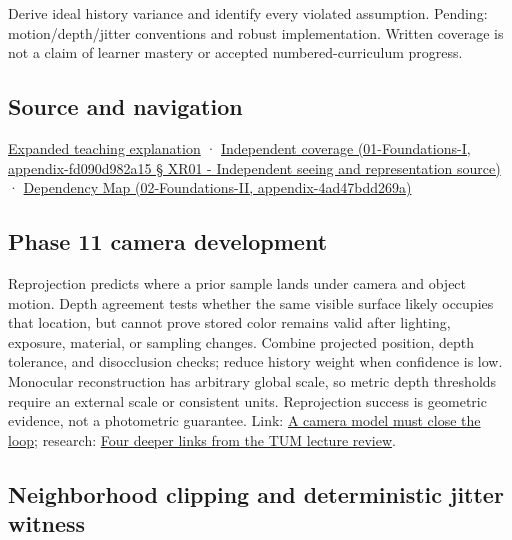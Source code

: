 Derive ideal history variance and identify every violated assumption. Pending: motion/depth/jitter conventions and robust implementation. Written coverage is not a claim of learner mastery or accepted numbered-curriculum progress.

\subsection{Source and navigation}\label{source-and-navigation}

\href{Continuous\%20Notes/University\%20-\%20Worlds,\%20Images\%20and\%20Inference\%20-\%20Graphics,\%20Vision\%20and\%20Photography\#Temporal\%20reconstruction\%20is\%20an\%20inference\%20about\%20correspondence}{Expanded teaching explanation} · \href{}{Independent coverage (01-Foundations-I, appendix-fd090d982a15 § XR01 - Independent seeing and representation source)} · \href{}{Dependency Map (02-Foundations-II, appendix-4ad47bdd269a)}

\subsection{Phase 11 camera development}\label{phase-11-camera-development}

Reprojection predicts where a prior sample lands under camera and object motion. Depth agreement tests whether the same visible surface likely occupies that location, but cannot prove stored color remains valid after lighting, exposure, material, or sampling changes. Combine projected position, depth tolerance, and disocclusion checks; reduce history weight when confidence is low. Monocular reconstruction has arbitrary global scale, so metric depth thresholds require an external scale or consistent units. Reprojection success is geometric evidence, not a photometric guarantee. Link: \href{Continuous\%20Notes/Computing\%20Foundations\%20-\%20From\%20Bits\%20to\%20C++\%20and\%20Systems\%20APIs\#A\%20camera\%20model\%20must\%20close\%20the\%20loop}{A camera model must close the loop}; research: \href{Continuous\%20Notes/Computing\%20Foundations\%20-\%20From\%20Bits\%20to\%20C++\%20and\%20Systems\%20APIs\#Four\%20deeper\%20links\%20from\%20the\%20TUM\%20lecture\%20review}{Four deeper links from the TUM lecture review}.

\subsection{Neighborhood clipping and deterministic jitter witness}\label{neighborhood-clipping-and-deterministic-jitter-witness}

